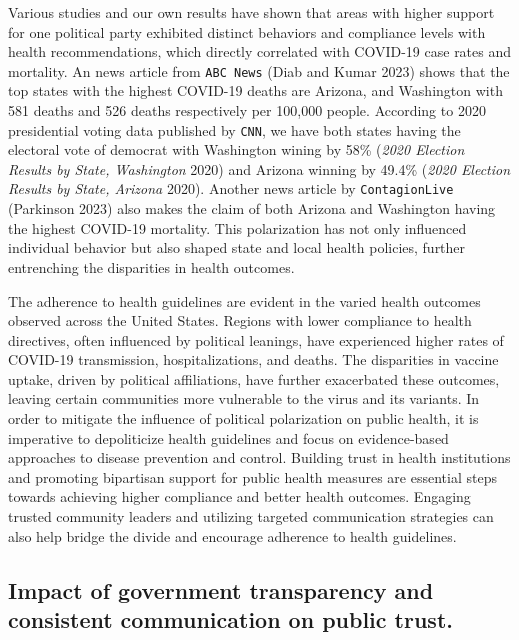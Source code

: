 \documentclass[
  letterpaper,
  DIV=11,
  numbers=noendperiod]{scrartcl}
\begin{document}
Various studies and our own results have shown that areas with higher
support for one political party exhibited distinct behaviors and
compliance levels with health recommendations, which directly correlated
with COVID-19 case rates and mortality. An news article from
\texttt{ABC\ News} (Diab and Kumar 2023) shows that the top states with
the highest COVID-19 deaths are Arizona, and Washington with 581 deaths
and 526 deaths respectively per 100,000 people. According to 2020
presidential voting data published by \texttt{CNN}, we have both states
having the electoral vote of democrat with Washington wining by 58\%
(\emph{2020 Election Results by State, Washington} 2020) and Arizona
winning by 49.4\% (\emph{2020 Election Results by State, Arizona} 2020).
Another news article by \texttt{ContagionLive} (Parkinson 2023) also
makes the claim of both Arizona and Washington having the highest
COVID-19 mortality. This polarization has not only influenced individual
behavior but also shaped state and local health policies, further
entrenching the disparities in health outcomes.

The adherence to health guidelines are evident in the varied health
outcomes observed across the United States. Regions with lower
compliance to health directives, often influenced by political leanings,
have experienced higher rates of COVID-19 transmission,
hospitalizations, and deaths. The disparities in vaccine uptake, driven
by political affiliations, have further exacerbated these outcomes,
leaving certain communities more vulnerable to the virus and its
variants. In order to mitigate the influence of political polarization
on public health, it is imperative to depoliticize health guidelines and
focus on evidence-based approaches to disease prevention and control.
Building trust in health institutions and promoting bipartisan support
for public health measures are essential steps towards achieving higher
compliance and better health outcomes. Engaging trusted community
leaders and utilizing targeted communication strategies can also help
bridge the divide and encourage adherence to health guidelines.

\subsection{Impact of government transparency and consistent
communication on public
trust.}\label{impact-of-government-transparency-and-consistent-communication-on-public-trust.}
\end{document}
